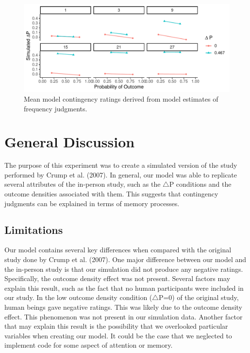 \documentclass[
  english,
  man,floatsintext]{apa6}
\begin{document}
\begin{figure}

{\centering \includegraphics{Thesis_google_test_files/figure-latex/unnamed-chunk-8-1} 

}

\caption{Mean model contingency ratings derived from model estimates of frequency judgments.}\label{fig:unnamed-chunk-8}
\end{figure}

\hypertarget{general-discussion}{%
\section{General Discussion}\label{general-discussion}}

The purpose of this experiment was to create a simulated version of the study performed by Crump et al. (2007). In general, our model was able to replicate several attributes of the in-person study, such as the \(\triangle\)P conditions and the outcome densities associated with them. This suggests that contingency judgments can be explained in terms of memory processes.

\hypertarget{limitations}{%
\subsection{Limitations}\label{limitations}}

Our model contains several key differences when compared with the original study done by Crump et al. (2007). One major difference between our model and the in-person study is that our simulation did not produce any negative ratings. Specifically, the outcome density effect was not present. Several factors may explain this result, such as the fact that no human participants were included in our study. In the low outcome density condition (\(\triangle\)P=0) of the original study, human beings gave negative ratings. This was likely due to the outcome density effect. This phenomenon was not present in our simulation data. Another factor that may explain this result is the possibility that we overlooked particular variables when creating our model. It could be the case that we neglected to implement code for some aspect of attention or memory.
\end{document}
